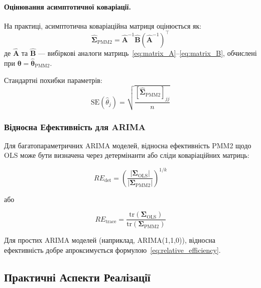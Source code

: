 \documentclass[12pt,a4paper]{article}
\begin{document}
	\paragraph{Оцінювання асимптотичної коваріації.}
	
	На практиці, асимптотична коваріаційна матриця оцінюється як:
	\begin{equation}
		\label{eq:estimated_covariance}
		\hat{\boldsymbol{\Sigma}}_{\text{PMM2}} = \hat{\mathbf{A}}^{-1} \hat{\mathbf{B}} (\hat{\mathbf{A}}^{-1})^\top
	\end{equation}
	де $\hat{\mathbf{A}}$ та $\hat{\mathbf{B}}$ --- вибіркові аналоги матриць~\eqref{eq:matrix_A}--\eqref{eq:matrix_B}, обчислені при $\boldsymbol{\theta} = \hat{\boldsymbol{\theta}}_{\text{PMM2}}$.
	
	Стандартні похибки параметрів:
	\begin{equation}
		\label{eq:standard_errors}
		\text{SE}(\hat{\theta}_j) = \sqrt{\frac{[\hat{\boldsymbol{\Sigma}}_{\text{PMM2}}]_{jj}}{n}}
	\end{equation}
	
	\subsubsection{Відносна Ефективність для ARIMA}
	
	Для багатопараметричних ARIMA моделей, відносна ефективність PMM2 щодо OLS може бути визначена через детермінанти або сліди коваріаційних матриць:
	
	\begin{equation}
		\label{eq:re_arima_det}
		RE_{\text{det}} = \left( \frac{|\boldsymbol{\Sigma}_{\text{OLS}}|}{|\boldsymbol{\Sigma}_{\text{PMM2}}|} \right)^{1/k}
	\end{equation}
	
	або
	
	\begin{equation}
		\label{eq:re_arima_trace}
		RE_{\text{trace}} = \frac{\text{tr}(\boldsymbol{\Sigma}_{\text{OLS}})}{\text{tr}(\boldsymbol{\Sigma}_{\text{PMM2}})}
	\end{equation}
	
	Для простих ARIMA моделей (наприклад, ARIMA(1,1,0)), відносна ефективність добре апроксимується формулою~\eqref{eq:relative_efficiency}.
	
	\subsection{Практичні Аспекти Реалізації}
	\label{subsec:implementation}
	
\end{document}
